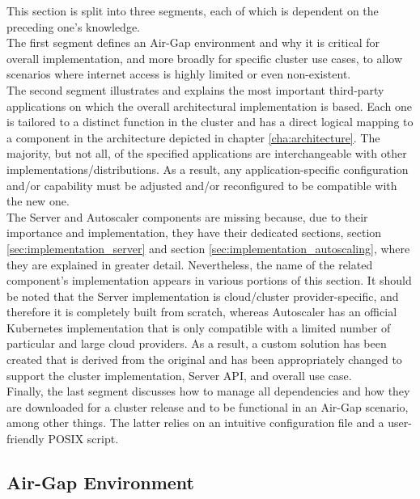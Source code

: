 This section is split into three segments, each of which is dependent on the
preceding one's knowledge. \\ %
The first segment defines an Air-Gap environment and why it is critical for
overall implementation, and more broadly for specific cluster use cases, to
allow scenarios where internet access is highly limited or even non-existent. \\ %
The second segment illustrates and explains the most important third-party
applications on which the overall architectural implementation is based. Each one
is tailored to a distinct function in the cluster and has a direct logical mapping
to a component in the architecture depicted in chapter \ref{cha:architecture}.
The majority, but not all, of the specified applications are interchangeable
with other implementations/distributions. As a result, any application-specific
configuration and/or capability must be adjusted and/or reconfigured to be
compatible with the new one. \\ %
The Server and Autoscaler components are missing because, due to their importance
and implementation, they have their dedicated sections, section \ref{sec:implementation_server}
and section \ref{sec:implementation_autoscaling}, where they are explained in
greater detail. Nevertheless, the name of the related component's implementation
appears in various portions of this section. It should be noted that the Server implementation
is cloud/cluster provider-specific, and therefore it is completely built from
scratch, whereas Autoscaler has an official Kubernetes implementation that is only
compatible with a limited number of particular and large cloud providers. As a
result, a custom solution has been created that is derived from the original and
has been appropriately changed to support the cluster implementation, Server API,
and overall use case. \\ %
Finally, the last segment discusses how to manage all dependencies and how they
are downloaded for a cluster release and to be functional in an Air-Gap scenario,
among other things. The latter relies on an intuitive configuration file and a
user-friendly POSIX script.

\subsection{Air-Gap Environment}
\label{subsec:implementation_dependencies_air_gap_environment}

